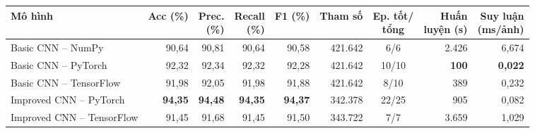 \begin{tabular}{lrrrrrcrr}
\toprule
Mô hình & Acc (\%) & \makecell[r]{Prec.\\(\%)} & \makecell[r]{Recall\\(\%)} & F1 (\%) & Tham số & \makecell[c]{Ep. tốt/\\tổng} & \makecell[r]{Huấn\\luyện (s)} & \makecell[r]{Suy luận\\(ms/ảnh)} \\
\midrule
Basic CNN – NumPy & 90{,}64 & 90{,}81 & 90{,}64 & 90{,}58 & 421{.}642 & 6/6 & 2{.}426 & 6{,}674 \\
Basic CNN – PyTorch & 92{,}32 & 92{,}34 & 92{,}32 & 92{,}28 & 421{.}642 & 10/10 & \textbf{100} & \textbf{0{,}022} \\
Basic CNN – TensorFlow & 91{,}98 & 92{,}05 & 91{,}98 & 91{,}88 & 421{.}642 & 8/10 & 389 & 0{,}232 \\
Improved CNN – PyTorch & \textbf{94{,}35} & \textbf{94{,}48} & \textbf{94{,}35} & \textbf{94{,}37} & 342{.}378 & 22/25 & 905 & 0{,}082 \\
Improved CNN – TensorFlow & 91{,}45 & 91{,}68 & 91{,}45 & 91{,}50 & 343{.}722 & 7/7 & 3{.}659 & 1{,}029 \\
\bottomrule
\end{tabular}

